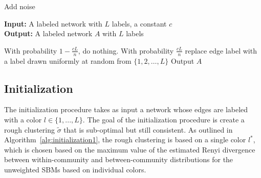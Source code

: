 \documentclass{article}
\begin{document}
\begin{algorithm}
\caption{Add noise}
\label{alg:noisify}
\textbf{Input:} A labeled network with $L$ labels, a constant $c$\\
\textbf{Output:} A labeled network $A$ with $L$ labels\\

\begin{algorithmic}
   \State With probability $1-\frac{cL}{n}$, do nothing. With probability $\frac{cL}{n}$ replace edge label with a label drawn uniformly at random from $\{1, 2, \dots, L\}$
\EndFor
\State Output $A$
\end{algorithmic}
\end{algorithm}

\subsection{Initialization}

The initialization procedure takes as input a network whose edges are labeled with a color $l \in \{1, ..., L\}$. The goal of the initialization procedure is create a rough clustering $\tilde{\sigma}$ that is sub-optimal but still consistent. As outlined in Algorithm~\ref{alg:initialization1}, the rough clustering is based on a single color $l^*$, which is chosen based on the maximum value of the estimated Renyi divergence between within-community and between-community distributions for the unweighted SBMs based on individual colors.
\end{document}
